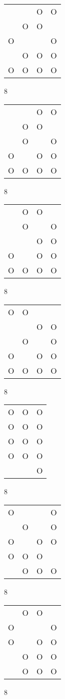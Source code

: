 \begin{tabular}{|m{0.2cm}m{0.2cm}m{0.2cm}m{0.2cm}|}\hline
 & &O&O\\
 &O&O& \\
O& & &O\\
 &O&O&O\\
O&O&O&O\\
\hline\end{tabular}8
\begin{tabular}{|m{0.2cm}m{0.2cm}m{0.2cm}m{0.2cm}|}\hline
 & &O&O\\
 &O&O& \\
 &O& &O\\
O& &O&O\\
O&O&O&O\\
\hline\end{tabular}8
\begin{tabular}{|m{0.2cm}m{0.2cm}m{0.2cm}m{0.2cm}|}\hline
 &O&O& \\
 &O& &O\\
 & &O&O\\
O& &O&O\\
O&O&O&O\\
\hline\end{tabular}8
\begin{tabular}{|m{0.2cm}m{0.2cm}m{0.2cm}m{0.2cm}|}\hline
O&O& & \\
 & &O&O\\
 &O& &O\\
O& &O&O\\
O&O&O&O\\
\hline\end{tabular}8
\begin{tabular}{|m{0.2cm}m{0.2cm}m{0.2cm}|}\hline
O&O&O\\
O&O&O\\
O&O&O\\
O&O&O\\
 & &O\\
\hline\end{tabular}8
\begin{tabular}{|m{0.2cm}m{0.2cm}m{0.2cm}m{0.2cm}|}\hline
O& & &O\\
 &O& &O\\
O& &O&O\\
O&O&O& \\
 &O&O&O\\
\hline\end{tabular}8
\begin{tabular}{|m{0.2cm}m{0.2cm}m{0.2cm}m{0.2cm}|}\hline
 &O&O& \\
O& & &O\\
O& &O&O\\
 &O&O&O\\
 &O&O&O\\
\hline\end{tabular}8

